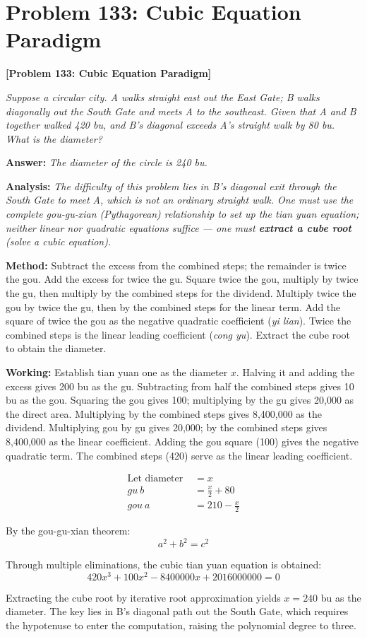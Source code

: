 \documentclass[11pt,a4paper]{book}
\newcommand{\answer}[1]{\noindent\textbf{\color{anacolor}Answer: }\textit{#1}\par}
\newcommand{\method}[1]{\noindent\textbf{\color{methodcolor}Method: }#1\par}
\newcommand{\working}[1]{\noindent\textbf{\color{workcolor}Working: }#1\par}
\newcommand{\analysis}[1]{\noindent\textbf{\color{anacolor}Analysis: }\textit{#1}\par}
\begin{document}
\section{Problem 133: Cubic Equation Paradigm}
\label{sec:prob133}

\noindent\textbf{\color{probcolor}[Problem 133: Cubic Equation Paradigm]}

\textit{Suppose a circular city. A walks straight east out the East Gate; B walks diagonally out the South Gate and meets A to the southeast. Given that A and B together walked 420 bu, and B's diagonal exceeds A's straight walk by 80 bu. What is the diameter?}

\answer{The diameter of the circle is 240 bu.}

\analysis{The difficulty of this problem lies in B's diagonal exit through the South Gate to meet A, which is not an ordinary straight walk. One must use the complete gou-gu-xian (Pythagorean) relationship to set up the tian yuan equation; neither linear nor quadratic equations suffice --- one must \textbf{extract a cube root} (solve a cubic equation).}

\method{Subtract the excess from the combined steps; the remainder is twice the gou. Add the excess for twice the gu. Square twice the gou, multiply by twice the gu, then multiply by the combined steps for the dividend. Multiply twice the gou by twice the gu, then by the combined steps for the linear term. Add the square of twice the gou as the negative quadratic coefficient (\textit{yi lian}). Twice the combined steps is the linear leading coefficient (\textit{cong yu}). Extract the cube root to obtain the diameter.}

\working{Establish tian yuan one as the diameter $x$. Halving it and adding the excess gives 200 bu as the gu. Subtracting from half the combined steps gives 10 bu as the gou. Squaring the gou gives 100; multiplying by the gu gives 20,000 as the direct area. Multiplying by the combined steps gives 8,400,000 as the dividend. Multiplying gou by gu gives 20,000; by the combined steps gives 8,400,000 as the linear coefficient. Adding the gou square (100) gives the negative quadratic term. The combined steps (420) serve as the linear leading coefficient.

\begin{align*}
\text{Let diameter } &= x \\
gu \ b &= \frac{x}{2} + 80 \\
gou \ a &= 210 - \frac{x}{2}
\end{align*}

By the gou-gu-xian theorem:
$$a^2 + b^2 = c^2$$

Through multiple eliminations, the cubic tian yuan equation is obtained:
$$420x^3 + 100x^2 - 8400000x + 2016000000 = 0$$

Extracting the cube root by iterative root approximation yields $x = 240$ bu as the diameter. The key lies in B's diagonal path out the South Gate, which requires the hypotenuse to enter the computation, raising the polynomial degree to three.}
\end{document}
